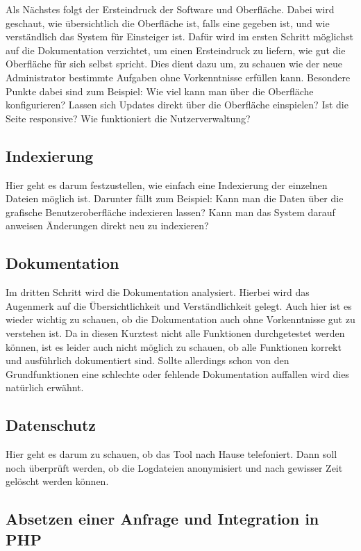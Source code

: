 Als Nächstes folgt der Ersteindruck der Software und Oberfläche. Dabei wird geschaut, wie übersichtlich die Oberfläche ist, falls eine gegeben ist, und wie verständlich das System für Einsteiger ist. Dafür wird im ersten Schritt möglichst auf die Dokumentation verzichtet, um einen Ersteindruck zu liefern, wie gut die Oberfläche für sich selbst spricht. Dies dient dazu um, zu schauen wie der neue Administrator bestimmte Aufgaben ohne Vorkenntnisse erfüllen kann. Besondere Punkte dabei sind zum Beispiel: Wie viel kann man über die Oberfläche konfigurieren? Lassen sich Updates direkt über die Oberfläche einspielen? Ist die Seite responsive? Wie funktioniert die Nutzerverwaltung?

\subsection{Indexierung}

Hier geht es darum festzustellen, wie einfach eine Indexierung der einzelnen Dateien möglich ist. Darunter fällt zum Beispiel: Kann man die Daten über die grafische Benutzeroberfläche indexieren lassen? Kann man das System darauf anweisen Änderungen direkt neu zu indexieren?


\subsection{Dokumentation}

Im dritten Schritt wird die Dokumentation analysiert. Hierbei wird das Augenmerk auf die Übersichtlichkeit und Verständlichkeit gelegt. Auch hier ist es wieder wichtig zu schauen, ob die Dokumentation auch ohne Vorkenntnisse gut zu verstehen ist. Da in diesen Kurztest nicht alle Funktionen durchgetestet werden können, ist es leider auch nicht möglich zu schauen, ob alle Funktionen korrekt und ausführlich dokumentiert sind. Sollte allerdings schon von den Grundfunktionen eine schlechte oder fehlende Dokumentation auffallen wird dies natürlich erwähnt. 

\subsection{Datenschutz}

Hier geht es darum zu schauen, ob das Tool nach Hause telefoniert. Dann soll noch überprüft werden, ob die Logdateien anonymisiert und nach gewisser Zeit gelöscht werden können.

\subsection{Absetzen einer Anfrage und Integration in PHP}

